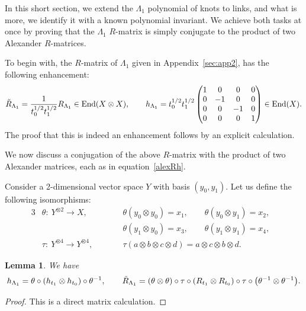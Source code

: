 \documentclass[pdftex]{sigma}
\numberwithin{equation}{section}
\newtheorem{Lemma}[Theorem]{Lemma}
\theoremstyle{definition}
\begin{document}
In this short section, we extend the $\Lambda_1$ polynomial of knots to links, and
what is more, we identify it with a known polynomial invariant.
We achieve both tasks at once by proving that the $\Lambda_1$ $R$-matrix is
simply conjugate to the product of two Alexander $R$-matrices.

To begin with, the $R$-matrix of $\Lambda_1$ given in Appendix~\ref{sec:app2},
has the following enhancement:
\begin{gather*}
\Tilde{R}_{\Lambda_1} = \frac{1}{t_0^{1/2} t_1^{1/2}} R_{\Lambda_1}
\in \mathrm{End}(X \otimes X),
\qquad h_{\Lambda_1} = t_0^{1/2} t_1^{1/2} \begin{pmatrix}
1 & 0 & 0 & 0 \\
0 & -1 & 0 & 0 \\
0 & 0 & -1 & 0 \\
0 & 0 & 0 & 1
\end{pmatrix} \in \mathrm{End}(X) .
\end{gather*}
The proof that this is indeed an enhancement follows by an explicit calculation.

We now discuss a conjugation of the above $R$-matrix with the product of two
Alexander matrices, each as in equation~\eqref{alexRh}.

Consider a 2-dimensional vector space $Y$ with basis $(y_0 , y_1)$. Let us define
the following isomorphisms:
\begin{alignat*}{3}
&\theta\colon \
 Y^{\otimes 2} \to X, \qquad&&
 \theta(y_0 \otimes y_0) = x_1,\qquad
 \theta(y_0 \otimes y_1) = x_2,& \\
 &&& \theta(y_1 \otimes y_0) = x_3,\qquad
 \theta(y_1 \otimes y_1) = x_4,&\\
&\tau\colon \
 Y^{\otimes 4} \to Y^{\otimes 4}, \qquad&&
 \tau(a \otimes b \otimes c \otimes d)= a \otimes c \otimes b \otimes d .&
\end{alignat*}

\begin{Lemma}\label{lem.RR}
We have
\begin{align*}
h_{\Lambda_1}  = \theta \circ (h_{t_1} \otimes h_{t_0}) \circ \theta^{-1},\qquad
\Tilde{R}_{\Lambda_1}   = (\theta \otimes \theta) \circ \tau
\circ (R_{t_1} \otimes R_{t_0}) \circ \tau \circ \bigl(\theta^{-1} \otimes \theta^{-1}\bigr) .
\end{align*}
\end{Lemma}

\begin{proof}
This is a direct matrix calculation.
\end{proof}
\end{document}
